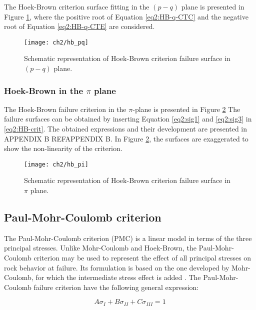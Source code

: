 The Hoek-Brown criterion surface fitting in the $(p-q)$ plane is presented in Figure \ref{fig2:hb_pq}, where the positive root of Equation \ref{eq2:HB-q-CTC} and the negative root of Equation \ref{eq2:HB-q-CTE} are considered.

\begin{figure}[tb]
    \centering
    \texttt{[image: ch2/hb\_pq]}
    \caption{Schematic representation of Hoek-Brown criterion failure surface in $(p-q)$ plane.}
    \label{fig2:hb_pq}
\end{figure} 

\subsubsection{Hoek-Brown in the \texorpdfstring{$\pi$}{pi} plane}\label{ch2:HB_pi}

The Hoek-Brown failure criterion in the $\pi$-plane is presented in Figure \ref{fig2:hb_pi} The failure surfaces can be obtained by inserting Equation \ref{eq2:sig1} and \ref{eq2:sig3} in \ref{eq2:HB-crit}. The obtained expressions and their development are presented in APPENDIX B REF{APPENDIX B}. In Figure \ref{fig2:hb_pi}, the surfaces are exaggerated to show the non-linearity of the criterion.  

\begin{figure}[tb]
    \centering
    \texttt{[image: ch2/hb\_pi]}
    \caption{Schematic representation of Hoek-Brown criterion failure surface in $\pi$ plane.}
    \label{fig2:hb_pi}
\end{figure} 

\subsection{Paul-Mohr-Coulomb criterion}\label{ch2:PMC}

The Paul-Mohr-Coulomb criterion (PMC) is a linear model in terms of the three principal stresses. Unlike Mohr-Coulomb and Hoek-Brown, the Paul-Mohr-Coulomb criterion may be used to represent the effect of all principal stresses on rock behavior at failure. Its formulation is based on the one developed by Mohr-Coulomb, for which the intermediate stress effect is added \cite{Paul1968}. The Paul-Mohr-Coulomb failure criterion have the following general expression:

\begin{equation}\label{eq2:PMC}
    A\sigma_I + B\sigma_{II}+C\sigma_{III} = 1
\end{equation}

